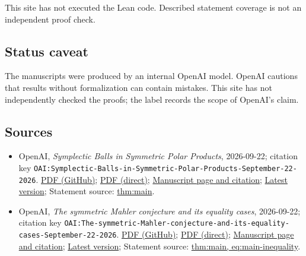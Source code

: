 \documentclass[11pt]{article}
\begin{document}
This site has not executed the Lean code. Described statement coverage is not an independent proof check.

\subsection{Status caveat}
The manuscripts were produced by an internal OpenAI model. OpenAI cautions that results without formalization can contain mistakes. This site has not independently checked the proofs; the label records the scope of OpenAI's claim.

\subsection{Sources}
\begin{itemize}
\item OpenAI, \emph{Symplectic Balls in Symmetric Polar Products}, 2026-09-22; citation key \texttt{OAI:Symplectic-Balls-in-Symmetric-Polar-Products-September-22-2026}. \href{https://github.com/openai/math/blob/adc7f1241b42e322a6451854ab7e4b4c146bf78a/preprints/Symplectic-Balls-in-Symmetric-Polar-Products-September-22-2026/paper.pdf}{PDF (GitHub)}; \href{https://github.com/openai/math/raw/adc7f1241b42e322a6451854ab7e4b4c146bf78a/preprints/Symplectic-Balls-in-Symmetric-Polar-Products-September-22-2026/paper.pdf}{PDF (direct)}; \href{https://github.com/openai/math/blob/adc7f1241b42e322a6451854ab7e4b4c146bf78a/preprints/Symplectic-Balls-in-Symmetric-Polar-Products-September-22-2026/README.md}{Manuscript page and citation}; \href{https://github.com/openai/math/blob/main/preprints/Symplectic-Balls-in-Symmetric-Polar-Products-September-22-2026/paper.pdf}{Latest version}; Statement source: \href{https://github.com/openai/math/blob/adc7f1241b42e322a6451854ab7e4b4c146bf78a/preprints/Symplectic-Balls-in-Symmetric-Polar-Products-September-22-2026/build/sections/introduction.tex\#L22}{thm:main}.
\item OpenAI, \emph{The symmetric Mahler conjecture and its equality cases}, 2026-09-22; citation key \texttt{OAI:The-symmetric-Mahler-conjecture-and-its-equality-cases-September-22-2026}. \href{https://github.com/openai/math/blob/adc7f1241b42e322a6451854ab7e4b4c146bf78a/preprints/The-symmetric-Mahler-conjecture-and-its-equality-cases-September-22-2026/paper.pdf}{PDF (GitHub)}; \href{https://github.com/openai/math/raw/adc7f1241b42e322a6451854ab7e4b4c146bf78a/preprints/The-symmetric-Mahler-conjecture-and-its-equality-cases-September-22-2026/paper.pdf}{PDF (direct)}; \href{https://github.com/openai/math/blob/adc7f1241b42e322a6451854ab7e4b4c146bf78a/preprints/The-symmetric-Mahler-conjecture-and-its-equality-cases-September-22-2026/README.md}{Manuscript page and citation}; \href{https://github.com/openai/math/blob/main/preprints/The-symmetric-Mahler-conjecture-and-its-equality-cases-September-22-2026/paper.pdf}{Latest version}; Statement source: \href{https://github.com/openai/math/blob/adc7f1241b42e322a6451854ab7e4b4c146bf78a/preprints/The-symmetric-Mahler-conjecture-and-its-equality-cases-September-22-2026/build/sections/introduction.tex\#L34}{thm:main, eq:main-inequality}.

\end{itemize}
\end{document}
